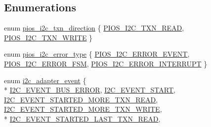 \subsection*{Enumerations}
\begin{DoxyCompactItemize}
\item 
enum \hyperlink{group___p_i_o_s___i2_c_ga317e7ea68e21f759a0326df96f278a2b}{pios\-\_\-i2c\-\_\-txn\-\_\-direction} \{ \hyperlink{group___p_i_o_s___i2_c_gga317e7ea68e21f759a0326df96f278a2bad792429208f1a6cfeccea519a221c4c2}{P\-I\-O\-S\-\_\-\-I2\-C\-\_\-\-T\-X\-N\-\_\-\-R\-E\-A\-D}, 
\hyperlink{group___p_i_o_s___i2_c_gga317e7ea68e21f759a0326df96f278a2ba46f0bf6cbe98473562192f85efa6dfca}{P\-I\-O\-S\-\_\-\-I2\-C\-\_\-\-T\-X\-N\-\_\-\-W\-R\-I\-T\-E}
 \}
\item 
enum \hyperlink{group___p_i_o_s___i2_c_gace4c564ee87e97a12bf76c69b113b230}{pios\-\_\-i2c\-\_\-error\-\_\-type} \{ \hyperlink{group___p_i_o_s___i2_c_ggace4c564ee87e97a12bf76c69b113b230a7652a614c638dd5c4118f5fed79f5891}{P\-I\-O\-S\-\_\-\-I2\-C\-\_\-\-E\-R\-R\-O\-R\-\_\-\-E\-V\-E\-N\-T}, 
\hyperlink{group___p_i_o_s___i2_c_ggace4c564ee87e97a12bf76c69b113b230ad118dc6496d40c8ab841a5552d1e8502}{P\-I\-O\-S\-\_\-\-I2\-C\-\_\-\-E\-R\-R\-O\-R\-\_\-\-F\-S\-M}, 
\hyperlink{group___p_i_o_s___i2_c_ggace4c564ee87e97a12bf76c69b113b230a5c7272b41a6bc0595c2e7408233eefda}{P\-I\-O\-S\-\_\-\-I2\-C\-\_\-\-E\-R\-R\-O\-R\-\_\-\-I\-N\-T\-E\-R\-R\-U\-P\-T}
 \}
\item 
enum \hyperlink{group___p_i_o_s___i2_c_ga2a8f77797f5dbd873514e92d3d043649}{i2c\-\_\-adapter\-\_\-event} \{ \\*
\hyperlink{group___p_i_o_s___i2_c_gga2a8f77797f5dbd873514e92d3d043649a8f6788d9ae0ccee581093112a2baa65c}{I2\-C\-\_\-\-E\-V\-E\-N\-T\-\_\-\-B\-U\-S\-\_\-\-E\-R\-R\-O\-R}, 
\hyperlink{group___p_i_o_s___i2_c_gga2a8f77797f5dbd873514e92d3d043649aef5af4537470d505c74d022cebc6366f}{I2\-C\-\_\-\-E\-V\-E\-N\-T\-\_\-\-S\-T\-A\-R\-T}, 
\hyperlink{group___p_i_o_s___i2_c_gga2a8f77797f5dbd873514e92d3d043649a3204e439e966796188a55b6be665b5d0}{I2\-C\-\_\-\-E\-V\-E\-N\-T\-\_\-\-S\-T\-A\-R\-T\-E\-D\-\_\-\-M\-O\-R\-E\-\_\-\-T\-X\-N\-\_\-\-R\-E\-A\-D}, 
\hyperlink{group___p_i_o_s___i2_c_gga2a8f77797f5dbd873514e92d3d043649a5d973e868fcb553ccbbd250602873bbe}{I2\-C\-\_\-\-E\-V\-E\-N\-T\-\_\-\-S\-T\-A\-R\-T\-E\-D\-\_\-\-M\-O\-R\-E\-\_\-\-T\-X\-N\-\_\-\-W\-R\-I\-T\-E}, 
\\*
\hyperlink{group___p_i_o_s___i2_c_gga2a8f77797f5dbd873514e92d3d043649a84c9669600504225d7646363d92fe8fc}{I2\-C\-\_\-\-E\-V\-E\-N\-T\-\_\-\-S\-T\-A\-R\-T\-E\-D\-\_\-\-L\-A\-S\-T\-\_\-\-T\-X\-N\-\_\-\-R\-E\-A\-D}, 

\end{DoxyCompactItemize}
